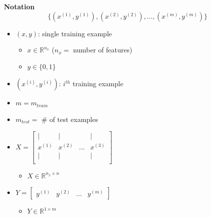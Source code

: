 \documentclass[12pt, letterpaper]{article}
\newcommand{\R}{\mathbb{R}}
\begin{document}
    \vspace{5mm}
    \textbf{Notation} 
    $$\{(x^{(1)},y^{(1)}),(x^{(2)},y^{(2)}),...,(x^{(m)},y^{(m)})\}$$
    \begin{itemize}
        \item $(x,y)$: single training example
        \begin{itemize}
            \item $x\in\R^{n_x}$ ($n_x=$ number of features)
            \item $y\in\{0,1\}$
        \end{itemize}
        \item $(x^{(i)},y^{(i)})$: $i^{th}$ training example
        \item $m=m_{train}$
        \item $m_{test}=$ \# of test examples
        \item $X=\begin{bmatrix}
            \mid & \mid & & \mid \\
            x^{(1)} & x^{(2)} & ... & x^{(3)} \\
            \mid & \mid & & \mid \\
        \end{bmatrix}$
        \begin{itemize}
            \item $X\in\R^{n_x\times n}$
        \end{itemize}
        \item $Y=\begin{bmatrix}
            y^{(1)} & y^{(2)} & ... & y^{(m)}
        \end{bmatrix}$
        \begin{itemize}
            \item $Y\in\R^{1\times m}$
        \end{itemize}
    \end{itemize}
\end{document}
